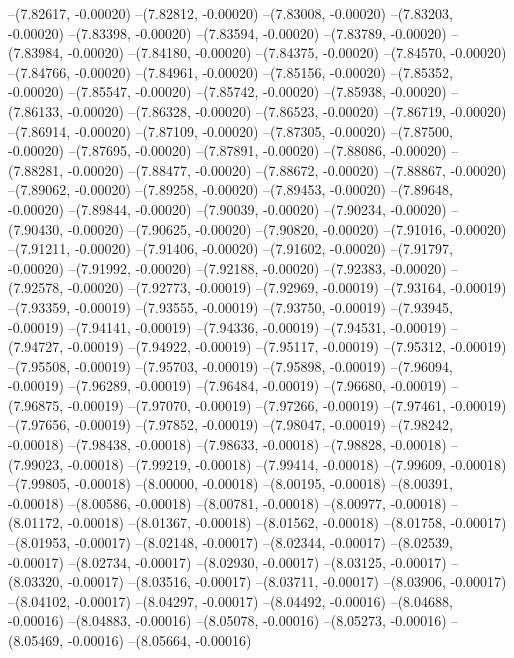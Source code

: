 --(7.82617, -0.00020)
--(7.82812, -0.00020)
--(7.83008, -0.00020)
--(7.83203, -0.00020)
--(7.83398, -0.00020)
--(7.83594, -0.00020)
--(7.83789, -0.00020)
--(7.83984, -0.00020)
--(7.84180, -0.00020)
--(7.84375, -0.00020)
--(7.84570, -0.00020)
--(7.84766, -0.00020)
--(7.84961, -0.00020)
--(7.85156, -0.00020)
--(7.85352, -0.00020)
--(7.85547, -0.00020)
--(7.85742, -0.00020)
--(7.85938, -0.00020)
--(7.86133, -0.00020)
--(7.86328, -0.00020)
--(7.86523, -0.00020)
--(7.86719, -0.00020)
--(7.86914, -0.00020)
--(7.87109, -0.00020)
--(7.87305, -0.00020)
--(7.87500, -0.00020)
--(7.87695, -0.00020)
--(7.87891, -0.00020)
--(7.88086, -0.00020)
--(7.88281, -0.00020)
--(7.88477, -0.00020)
--(7.88672, -0.00020)
--(7.88867, -0.00020)
--(7.89062, -0.00020)
--(7.89258, -0.00020)
--(7.89453, -0.00020)
--(7.89648, -0.00020)
--(7.89844, -0.00020)
--(7.90039, -0.00020)
--(7.90234, -0.00020)
--(7.90430, -0.00020)
--(7.90625, -0.00020)
--(7.90820, -0.00020)
--(7.91016, -0.00020)
--(7.91211, -0.00020)
--(7.91406, -0.00020)
--(7.91602, -0.00020)
--(7.91797, -0.00020)
--(7.91992, -0.00020)
--(7.92188, -0.00020)
--(7.92383, -0.00020)
--(7.92578, -0.00020)
--(7.92773, -0.00019)
--(7.92969, -0.00019)
--(7.93164, -0.00019)
--(7.93359, -0.00019)
--(7.93555, -0.00019)
--(7.93750, -0.00019)
--(7.93945, -0.00019)
--(7.94141, -0.00019)
--(7.94336, -0.00019)
--(7.94531, -0.00019)
--(7.94727, -0.00019)
--(7.94922, -0.00019)
--(7.95117, -0.00019)
--(7.95312, -0.00019)
--(7.95508, -0.00019)
--(7.95703, -0.00019)
--(7.95898, -0.00019)
--(7.96094, -0.00019)
--(7.96289, -0.00019)
--(7.96484, -0.00019)
--(7.96680, -0.00019)
--(7.96875, -0.00019)
--(7.97070, -0.00019)
--(7.97266, -0.00019)
--(7.97461, -0.00019)
--(7.97656, -0.00019)
--(7.97852, -0.00019)
--(7.98047, -0.00019)
--(7.98242, -0.00018)
--(7.98438, -0.00018)
--(7.98633, -0.00018)
--(7.98828, -0.00018)
--(7.99023, -0.00018)
--(7.99219, -0.00018)
--(7.99414, -0.00018)
--(7.99609, -0.00018)
--(7.99805, -0.00018)
--(8.00000, -0.00018)
--(8.00195, -0.00018)
--(8.00391, -0.00018)
--(8.00586, -0.00018)
--(8.00781, -0.00018)
--(8.00977, -0.00018)
--(8.01172, -0.00018)
--(8.01367, -0.00018)
--(8.01562, -0.00018)
--(8.01758, -0.00017)
--(8.01953, -0.00017)
--(8.02148, -0.00017)
--(8.02344, -0.00017)
--(8.02539, -0.00017)
--(8.02734, -0.00017)
--(8.02930, -0.00017)
--(8.03125, -0.00017)
--(8.03320, -0.00017)
--(8.03516, -0.00017)
--(8.03711, -0.00017)
--(8.03906, -0.00017)
--(8.04102, -0.00017)
--(8.04297, -0.00017)
--(8.04492, -0.00016)
--(8.04688, -0.00016)
--(8.04883, -0.00016)
--(8.05078, -0.00016)
--(8.05273, -0.00016)
--(8.05469, -0.00016)
--(8.05664, -0.00016)
